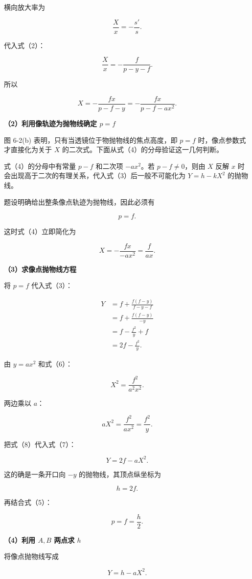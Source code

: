 \documentclass[12pt,a4paper,UTF8]{ctexart}
\begin{document}
横向放大率为

\[
\frac Xx=-\frac{s'}s.
\]

代入式（2）：

\[
\frac Xx=-\frac{f}{p-y-f}.
\]

所以

\[
X=-\frac{fx}{p-f-y}
=-\frac{fx}{p-f-ax^2}.\tag{4}
\]

\textbf{（2）利用像轨迹为抛物线确定 \(p=f\)}

图 6-2(b) 表明，只有当透镜位于物抛物线的焦点高度，即 \(p=f\)
时，像点参数式才直接化为关于 \(X\)
的二次式。下面从式（4）的分母验证这一几何判断。

式（4）的分母中有常量 \(p-f\) 和二次项 \(-ax^2\)。若 \(p-f\ne0\)，则由
\(X\) 反解 \(x\) 时会出现高于二次的有理关系，代入式（3）后一般不可能化为
\(Y=h-kX^2\) 的抛物线。

题设明确给出整条像点轨迹为抛物线，因此必须有

\[
\boxed{p=f}.\tag{5}
\]

这时式（4）立即简化为

\[
X=-\frac{fx}{-ax^2}
=\frac{f}{ax}.\tag{6}
\]

\textbf{（3）求像点抛物线方程}

将 \(p=f\) 代入式（3）：

\[
\begin{aligned}
Y
&=f+\frac{f(f-y)}{f-y-f}\\
&=f+\frac{f(f-y)}{-y}\\
&=f-\frac{f^2}{y}+f\\
&=2f-\frac{f^2}{y}.
\end{aligned}\tag{7}
\]

由 \(y=ax^2\) 和式（6）：

\[
X^2=\frac{f^2}{a^2x^2}.
\]

两边乘以 \(a\)：

\[
aX^2=\frac{f^2}{ax^2}=\frac{f^2}{y}.\tag{8}
\]

把式（8）代入式（7）：

\[
\boxed{Y=2f-aX^2}.\tag{9}
\]

这的确是一条开口向 \(-y\) 的抛物线，其顶点纵坐标为

\[
h=2f.\tag{10}
\]

再结合式（5）：

\[
\boxed{p=f=\frac h2}.\tag{11}
\]

\textbf{（4）利用 \(A,B\) 两点求 \(h\)}

将像点抛物线写成

\[
Y=h-aX^2.\tag{12}
\]
\end{document}
